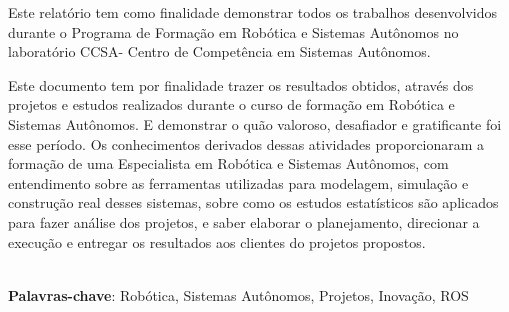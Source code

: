 \begin{thesisresumo}
Este relatório tem como finalidade demonstrar todos os trabalhos desenvolvidos durante o Programa de Formação em Robótica e Sistemas Autônomos no laboratório CCSA- Centro de Competência em Sistemas Autônomos.

Este documento tem por finalidade trazer os resultados obtidos, através dos projetos e estudos realizados durante o curso de formação em Robótica e Sistemas Autônomos. E demonstrar o quão valoroso, desafiador e gratificante foi esse período. Os conhecimentos derivados dessas atividades proporcionaram a formação de uma Especialista em Robótica e Sistemas Autônomos, com entendimento sobre as ferramentas utilizadas para modelagem, simulação e construção real desses sistemas, sobre como os estudos estatísticos são aplicados para fazer análise dos projetos, e saber elaborar o planejamento, direcionar a execução e entregar os resultados aos clientes do projetos propostos. 



\ \\


\textbf{Palavras-chave}: Robótica, Sistemas Autônomos, Projetos, Inovação, ROS

\end{thesisresumo}
